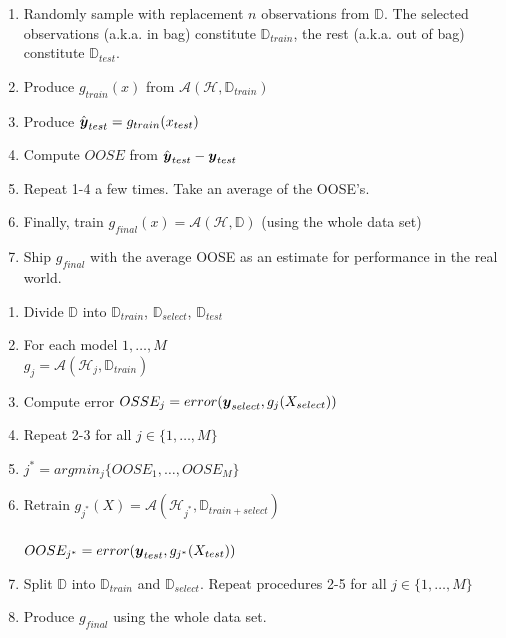 \documentclass[12pt]{article}
\begin{document}
\begin{enumerate}
\begin{enumerate}[1.]
\end{enumerate}


\begin{enumerate}[1.]
\item Randomly sample with replacement $n$ observations from $\mathbb{D}$. The selected observations (a.k.a. in bag) constitute $\mathbb{D}_{train}$, the rest (a.k.a. out of bag) constitute $\mathbb{D}_{test}$. 
\item Produce $g_{train}(x)$ from $\mathcal{A}(\mathcal{H}, \mathbb{D}_{train})$
\item Produce $\hat{\boldsymbol{y}}_{test} = g_{train}(x_{test})$ 
\item Compute $OOSE$ from $\hat{\boldsymbol{y}}_{test} - \boldsymbol{y}_{test}$
\item Repeat 1-4 a few times. Take an average of the OOSE's. 
\item Finally, train $g_{final}(x) = \mathcal{A}(\mathcal{H}, \mathbb{D})$ (using the whole data set)
\item Ship $g_{final}$ with the average OOSE as an estimate for performance in the real world. 

\end{enumerate}


\begin{enumerate}[1.]
\item Divide $\mathbb{D}$ into $\mathbb{D}_{train}$, $\mathbb{D}_{select}$, $\mathbb{D}_{test}$
\item For each model $1, \dots, M$ \\
$g_j = \mathcal{A} (\mathcal{H}_j, \mathbb{D}_{train})$
\item Compute error $OSSE_j = error( \boldsymbol{y}_{select}, g_j (X_{select}))$
\item Repeat 2-3 for all $j \in \{ 1, \dots, M\}$
\item $j^* = argmin_j \{OOSE_1, \dots, OOSE_M\}$
\item Retrain $g_{j^*} (X) = \mathcal{A}  (\mathcal{H}_{j^*}, \mathbb{D}_{train + select})$ \\ \\
$OOSE_{j^*} = error( \boldsymbol{y}_{test}, g_{j^*} (X_{test}))$
\item Split $\mathbb{D}$ into $\mathbb{D}_{train}$ and $\mathbb{D}_{select}$. Repeat procedures 2-5 for all $j \in \{1, \dots, M\}$
\item Produce $g_{final}$ using the whole data set. 
\end{enumerate}


\end{enumerate}
\end{document}
